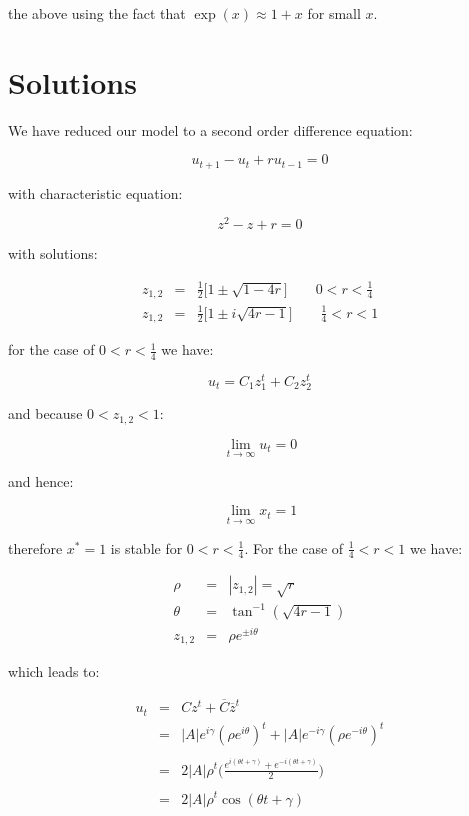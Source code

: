 \documentclass{report}
\begin{document}
the above using the fact that $\exp(x) \approx 1 + x$ for small $x$. \bigskip




\section{Solutions}

We have reduced our model to a second order difference equation: \bigskip

\[
    u_{t + 1} - u_t + r u_{t - 1} = 0
\]\medskip

with characteristic equation: \bigskip

\[
    z^2 - z + r = 0
\]\medskip

with solutions: \bigskip

\begin{eqnarray*}
    z_{1, 2} & = & \frac{1}{2} \Big[ 1 \pm \sqrt{1 - 4 r} \Big] \qquad 0 < r < \frac{1}{4} \\
    z_{1, 2} & = & \frac{1}{2} \Big[ 1 \pm i \sqrt{4 r - 1} \Big] \qquad \frac{1}{4} < r < 1
\end{eqnarray*}\medskip

for the case of $0 < r < \frac{1}{4}$ we have: \bigskip

\[
    u_t = C_1 z_1^t + C_2 z_2^t
\]\medskip

and because $0 < z_{1, 2} < 1$: \bigskip

\[
    \lim_{t \to \infty} u_t = 0
\]\medskip

and hence: \bigskip

\[
    \lim_{t \to \infty} x_t = 1
\]\medskip

therefore $x^* = 1$ is stable for $0 < r < \frac{1}{4}$. For the case of $\frac{1}{4} < r < 1$
we have: \bigskip

\begin{eqnarray*}
      \rho & = & \left| z_{1, 2} \right| = \sqrt{r} \\
    \theta & = & \tan^{-1}(\sqrt{4 r - 1}) \\
  z_{1, 2} & = & \rho e^{\pm i \theta}
\end{eqnarray*}\medskip

which leads to: \bigskip

\begin{eqnarray*}
    u_t & = & C z^t + \overline{C} \overline{z}^t \\
        & = & \left| A \right| e^{i \gamma} (\rho e^{i \theta})^t + \left| A \right| e^{-i \gamma} (\rho e^{- i \theta})^t \\\\
        & = & 2 \left| A \right| \rho^t \Bigg(\frac{e^{i (\theta t + \gamma)} + e^{- i (\theta t + \gamma)}}{2}\Bigg) \\\\
        & = & 2 \left| A \right| \rho^t \cos(\theta t + \gamma)
\end{eqnarray*}\medskip
\end{document}

